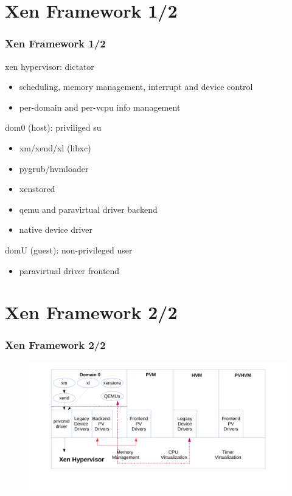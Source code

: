 \documentclass[aspectratio=169]{beamer}
\begin{document}
\section{Xen Framework 1/2}
\begin{frame}
\frametitle{Xen Framework 1/2}
\begin{block}{xen hypervisor: dictator}
\begin{itemize}
\item scheduling, memory management, interrupt and device control
\item per-domain and per-vcpu info management
\end{itemize}
\end{block}
\begin{block}{dom0 (host): priviliged su}
\begin{itemize}
\item xm/xend/xl (libxc)
\item pygrub/hvmloader
\item xenstored
\item qemu and paravirtual driver backend
\item native device driver
\end{itemize}
\end{block}
\begin{block}{domU (guest): non-privileged user}
\begin{itemize}
\item paravirtual driver frontend
\end{itemize}
\end{block}
\end{frame}


\section{Xen Framework 2/2}
\begin{frame}
\frametitle{Xen Framework 2/2}
\begin{figure}
\includegraphics[width=1.0\linewidth]{figures/xen.pdf}
\end{figure}
\end{frame}
\end{document}
